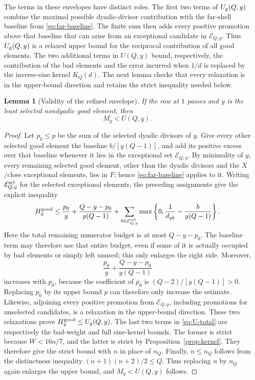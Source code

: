 \documentclass[11pt]{article}
\newtheorem{lemma}[theorem]{Lemma}
\theoremstyle{definition}
\theoremstyle{remark}
\begin{document}
The terms in these envelopes have distinct roles.  The first two terms of
\(U_{\rm g}(Q,y)\) combine the maximal possible dyadic-divisor contribution
with the far-shell baseline from
\eqref{eq:far-baseline}.  The finite sum then adds every positive promotion
above that baseline that can arise from an exceptional candidate in
\(\mathcal E_{Q,y}\).  Thus \(U_{\rm g}(Q,y)\) is a relaxed upper bound for
the reciprocal contribution of all good elements.  The two additional terms
in \(U(Q,y)\) bound, respectively, the contribution of the bad elements and
the error incurred when \(1/d\) is replaced by the inverse-sine kernel
\(K_Q(d)\).  The next lemma checks that every relaxation is in the
upper-bound direction and retains the strict inequality needed below.

\begin{lemma}[Validity of the refined envelope]\label{lem:U-valid}
If the row at \(1\) passes and \(y\) is the least selected
nondyadic good element, then
\[
 M_y<U(Q,y).
\]
\end{lemma}

\begin{proof}
Let \(p_0\le p\) be the sum of the selected dyadic divisors of \(y\).
Give every other selected good element the baseline
\(b/[y(Q-1)]\), and add its positive excess over that baseline whenever
it lies in the exceptional set \(\mathcal E_{Q,y}\).  By minimality of
\(y\), every remaining selected good element, other than the dyadic
divisors and the \(X\)/close exceptional elements, lies in \(F\); hence
\eqref{eq:far-baseline} applies to it.
Writing \(\mathcal E^{\rm sel}_{Q,y}\) for the selected exceptional
elements, the preceding assignments give the explicit inequality
\[
 H_y^{\rm good}\le
 \frac{p_0}{y}+\frac{Q-y-p_0}{y(Q-1)}
 +\sum_{b\in\mathcal E^{\rm sel}_{Q,y}}
 \max\left\{0,\frac1{d_{yb}}-\frac{b}{y(Q-1)}\right\}.
\]
Here the total remaining numerator budget is at most \(Q-y-p_0\).  The
baseline term may therefore use that entire budget, even if some of it is
actually occupied by bad elements or simply left unused; this only enlarges the
right side.  Moreover,
\[
 \frac{p_0}{y}+\frac{Q-y-p_0}{y(Q-1)}
\]
increases with \(p_0\), because the coefficient of \(p_0\) is
\((Q-2)/[y(Q-1)]>0\).  Replacing \(p_0\) by its upper bound \(p\) can
therefore only increase the estimate.  Likewise, adjoining every positive
promotion from \(\mathcal E_{Q,y}\), including promotions for unselected
candidates, is a relaxation in the upper-bound direction.  These two
relaxations prove \(H_y^{\rm good}\le U_{\rm g}(Q,y)\).
The last two terms in \eqref{eq:U-total} are respectively the bad-weight
and full sine-kernel bounds.  The former is strict because
\(W<16n/7\), and the latter is strict by
Proposition~\ref{prop:kernel}.  They therefore give the strict bound with
\(n\) in place of \(n_Q\).  Finally, \(n\le n_Q\) follows from the
distinctness inequality \((n+1)(n+2)/2\le Q\).  Thus replacing \(n\) by
\(n_Q\) again enlarges the upper bound, and \(M_y<U(Q,y)\) follows.
\end{proof}
\end{document}
